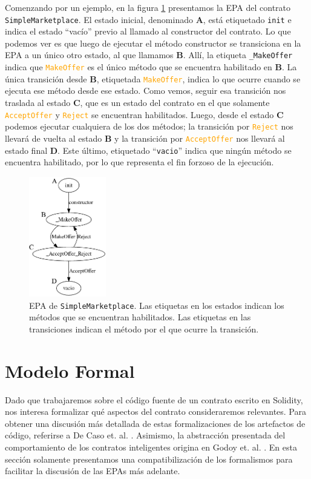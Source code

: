Comenzando por un ejemplo, en la figura \ref{fig:epa-example} presentamos la EPA del contrato \texttt{Simple\-Marketplace}.
El estado inicial, denominado \textbf{A}, está etiquetado \texttt{init} e indica el estado ``vacío'' previo al llamado al constructor del contrato.
Lo que podemos ver es que luego de ejecutar el método constructor se transiciona en la EPA a un único otro estado, al que llamamos \textbf{B}.
Allí, la etiqueta \texttt{\_MakeOffer} indica que \textcolor{orange}{\texttt{MakeOffer}} es el único método que se encuentra habilitado en \textbf{B}.
La única transición desde \textbf{B}, etiquetada \textcolor{orange}{\texttt{MakeOffer}}, indica lo que ocurre cuando se ejecuta ese método desde ese estado. Como vemos, seguir esa transición nos traslada  al estado \textbf{C}, que es un estado del contrato en el que solamente \textcolor{orange}{\texttt{AcceptOffer}} y \textcolor{orange}{\texttt{Reject}} se encuentran habilitados.
Luego, desde el estado \textbf{C} podemos ejecutar cualquiera de los dos métodos; la transición por \textcolor{orange}{\texttt{Reject}} nos llevará de vuelta al estado \textbf{B} y la transición por \textcolor{orange}{\texttt{AcceptOffer}} nos llevará al estado final \textbf{D}.
Este último, etiquetado ``\texttt{vacio}'' indica que ningún método se encuentra habilitado, por lo que representa el fin forzoso de la ejecución.



\begin{figure}
    \centering
    \includegraphics[width=0.3\textwidth]{figs/simple-merketplace-epa.png}
    \caption{EPA de \texttt{SimpleMarketplace}. Las etiquetas en los estados indican los métodos que se encuentran habilitados. Las etiquetas en las transiciones indican el método por el que ocurre la transición.}
    \label{fig:epa-example}
\end{figure}

\section{Modelo Formal}
Dado que trabajaremos sobre el código fuente de un contrato escrito en Solidity, nos interesa formalizar qué aspectos del contrato consideraremos relevantes.
Para obtener una discusión más detallada de estas formalizaciones de los artefactos de código, referirse a De Caso et. al.  \cite{de-caso-epa}.
Asimismo, la abstracción presentada del comportamiento de los contratos inteligentes origina en Godoy et. al. \cite{predicate-abstraction-for-smart-contract-validation}.
En esta sección solamente presentamos una compatibilización de los formalismos para facilitar la discusión de las EPAs más adelante.

